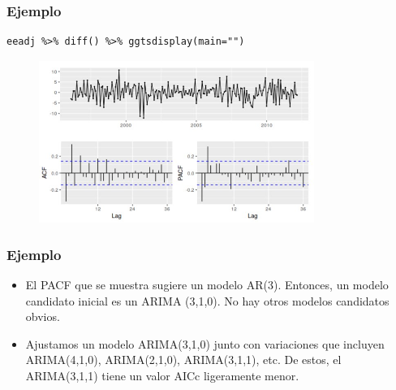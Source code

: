 \documentclass[10pt]{beamer}
\begin{document}





\begin{frame}[fragile]
\frametitle{Ejemplo}


\lstset{language=r,label= ,caption= ,captionpos=b,numbers=none}
\begin{lstlisting}
eeadj %>% diff() %>% ggtsdisplay(main="")
\end{lstlisting}

\pause

\begin{figure}
\begin{center}
    \includegraphics[width=0.8\textwidth]{Imagen17.JPG}
\end{center}
\end{figure}


\end{frame}






\begin{frame}[fragile]
\frametitle{Ejemplo}


\begin{itemize}
\item El PACF que se muestra sugiere un modelo AR(3). Entonces, un modelo candidato inicial es un ARIMA (3,1,0). No hay otros modelos candidatos obvios.

\vspace{3mm}

\item Ajustamos un modelo ARIMA(3,1,0) junto con variaciones que incluyen ARIMA(4,1,0), ARIMA(2,1,0), ARIMA(3,1,1), etc. De estos, el ARIMA(3,1,1) tiene un valor AICc ligeramente menor. 
\end{itemize}

\end{frame}
\end{document}
